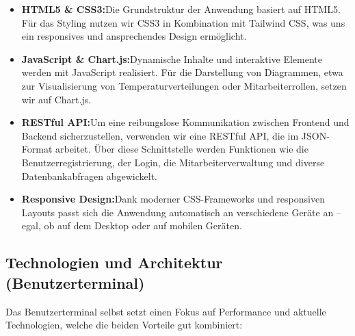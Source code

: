 \begin{itemize}
    \item \textbf{HTML5 \& CSS3:}\newline Die Grundstruktur der Anwendung basiert auf HTML5. Für das Styling nutzen wir CSS3 in Kombination mit Tailwind CSS, was uns ein responsives und ansprechendes Design ermöglicht.
    \item \textbf{JavaScript \& Chart.js:}\newline Dynamische Inhalte und interaktive Elemente werden mit JavaScript realisiert. Für die Darstellung von Diagrammen, etwa zur Visualisierung von Temperaturverteilungen oder Mitarbeiterrollen, setzen wir auf Chart.js.
    \item \textbf{RESTful API:}\newline Um eine reibungslose Kommunikation zwischen Frontend und Backend sicherzustellen, verwenden wir eine RESTful API, die im JSON-Format arbeitet. Über diese Schnittstelle werden Funktionen wie die Benutzerregistrierung, der Login, die Mitarbeiterverwaltung und diverse Datenbankabfragen abgewickelt.
    \item \textbf{Responsive Design:}\newline Dank moderner CSS-Frameworks und responsiven Layouts passt sich die Anwendung automatisch an verschiedene Geräte an – egal, ob auf dem Desktop oder auf mobilen Geräten.
\end{itemize}

\subsection{Technologien und Architektur (Benutzerterminal)}

Das Benutzerterminal selbst setzt einen Fokus auf Performance und aktuelle Technologien, welche die beiden Vorteile gut kombiniert:

